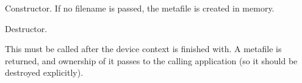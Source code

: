 \label{wxmetafiledcctor}


Constructor. If no filename is passed, the metafile is created
in memory.

\label{wxmetafiledcdtor}


Destructor.

\label{wxmetafiledcclose}


This must be called after the device context is finished with. A
metafile is returned, and ownership of it passes to the calling
application (so it should be destroyed explicitly).

